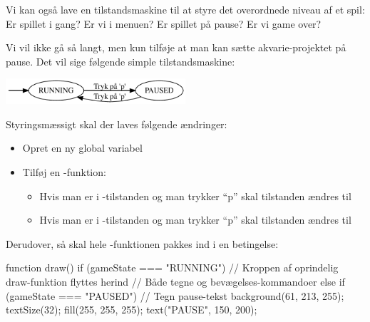 \documentclass{ucph-handout}
\begin{document}
\begin{exercisebox}[adjusted title=Sæt på pause (Akvarie-projektet)]
Vi kan også lave en tilstandsmaskine til at styre det overordnede
niveau af et spil: Er spillet i gang? Er vi i menuen? Er spillet på
pause? Er vi game over?

Vi vil ikke gå så langt, men kun tilføje at man kan sætte
akvarie-projektet på pause. Det vil sige følgende simple tilstandsmaskine:
\begin{center}
\includegraphics[width=0.5\textwidth]{../illustrations/graphviz/pause}
\end{center}


\noindent
Styringsmæssigt skal der laves følgende ændringer:
\begin{itemize}
\item Opret en ny global variabel 
\item Tilføj en -funktion:
  \begin{itemize}
  \item Hvis man er i -tilstanden og man trykker
    ``p'' skal tilstanden ændres til 
  \item Hvis man er i -tilstanden og man trykker ``p''
    skal tilstanden ændres til 
\end{itemize}
\end{itemize}

\noindent
Derudover, så skal hele -funktionen pakkes ind i en betingelse:
\begin{javascript}
function draw() {
    if (gameState === "RUNNING") {
        // Kroppen af oprindelig draw-funktion flyttes herind
        // Både tegne og bevægelses-kommandoer
    }
    else if (gameState === "PAUSED") {
        // Tegn pause-tekst
        background(61, 213, 255);
        textSize(32);
        fill(255, 255, 255);
        text("PAUSE", 150, 200);
    }
}
\end{javascript}


\end{exercisebox}
\end{document}
